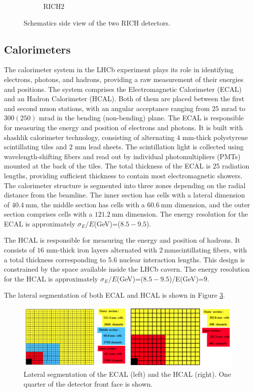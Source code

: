 \begin{figure}
\begin{subfigure}{0.48\textwidth}
    \caption{RICH$2$}\label{rich2}
    \end{subfigure}
    \caption{Schematics side view of the two RICH detectors.}
    \label{fig:rich}
\end{figure}

\subsection{Calorimeters}
\sloppy
The calorimeter system in the LHCb experiment\cite{LHCb:2000vji} plays its role in identifying electrons, photons, and hadrons, providing a raw measurement of their energies and positions. The system comprises the Electromagnetic Calorimeter (ECAL) and an  Hadron Calorimeter (HCAL). Both of them are  placed between the first and second muon stations, with an angular acceptance ranging from $25$ mrad to $300(250)$ mrad in the bending (non-bending) plane. 
The ECAL is responsible for measuring the energy and position of electrons and photons. It is built with shashlik calorimeter technology, consisting of alternating $4$ mm-thick polystyrene scintillating tiles and $2$ mm lead sheets. The scintillation light is collected using wavelength-shifting fibers and read out by individual photomultipliers (PMTs) mounted at the back of the tiles. The total thickness of the ECAL is 25 radiation lengths, providing sufficient thickness to contain most electromagnetic showers. The calorimeter structure is segmented into three zones depending on the radial distance from the beamline. The inner section has cells with a lateral dimension of $\SI{40.4}{\milli\meter}$, the middle section has cells with a $\SI{60.6}{\milli\meter}$ dimension, and the outer section comprises cells with a $\SI{121.2}{\milli\meter}$ dimension. The energy resolution for the ECAL is approximately 
 $\sigma_E/E$(GeV)=($8.5−9.5$).

\sloppy
The HCAL is responsible for measuring the energy and position of hadrons. It consists of $16$ mm-thick iron layers alternated with $\SI{2}{\milli\meter}$scintillating fibers, with a total thickness corresponding to 5.6 nuclear interaction lengths. This design is constrained by the space available inside the LHCb cavern. The energy resolution for the HCAL is approximately $\sigma_E/E$(GeV)=($8.5−9.5$)/E(GeV)=$9$.

The lateral segmentation of both ECAL and HCAL is shown in Figure \ref{fig:cal_system}.
\begin{figure}
    \centering
    \includegraphics[width=\textwidth]{figures/CAL_system.png}
    \caption{Lateral segmentation of the ECAL (left) and the HCAL (right). One quarter of the detector front face is shown.}
    \label{fig:cal_system}
\end{figure}
